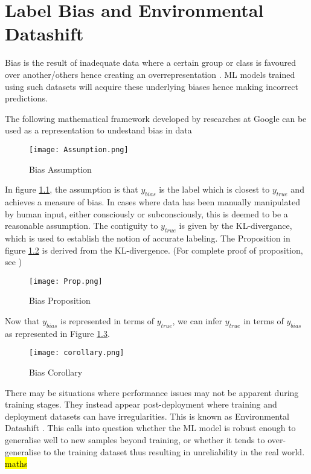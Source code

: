 \chapter{Label Bias and Environmental Datashift}
Bias is the result of inadequate data where a certain group or class is favoured over another/others hence creating an overrepresentation \cite{Jiang}\cite{saria2019tutorial}.
ML models trained using such datasets will acquire these underlying biases hence making incorrect predictions.

The following mathematical framework developed by researches at Google can be used as a representation to undestand bias in data \cite{Jiang}

\begin{figure}[h]
    \texttt{[image: Assumption.png]}
    \centering
    \caption{Bias Assumption \cite{Jiang}}
    \label{fig:Assumption}
\end{figure}

In figure \ref{fig:Assumption}, the assumption is that $y_{bias}$ is the label which is closest to $y_{true}$ and achieves a measure of bias.
In cases where data has been manually manipulated by human input, either consciously or subconsciously, this is deemed to be a reasonable assumption.
The contiguity to $y_{true}$ is given by the KL-divergance, which is used to establish the notion of accurate labeling. 
The Proposition in figure \ref{fig:Proposition} is derived from the KL-divergence. (For complete proof of proposition, see \cite{Jiang})

\begin{figure}[h]
    \texttt{[image: Prop.png]}
    \centering
    \caption{Bias Proposition \cite{Jiang}}
    \label{fig:Proposition}
\end{figure}

Now that $y_{bias}$ is represented in terms of $y_{true}$, we can infer $y_{true}$ in terms of $y_{bias}$ as represented in Figure \ref{fig:Corollary}.

\begin{figure}[h]
    \texttt{[image: corollary.png]}
    \centering
    \caption{Bias Corollary \cite{Jiang}}
    \label{fig:Corollary}
\end{figure}

There may be situations where performance issues may not be apparent during training stages. 
They instead appear post-deployment where training and deployment datasets can have irregularities. 
This is known as Environmental Datashift \cite{saria2019tutorial}. 
This calls into question whether the ML model is robust enough to generalise well to new samples beyond training, or whether it tends to over-generalise to the training dataset thus resulting in unreliability in the real world.
\hl{maths}

